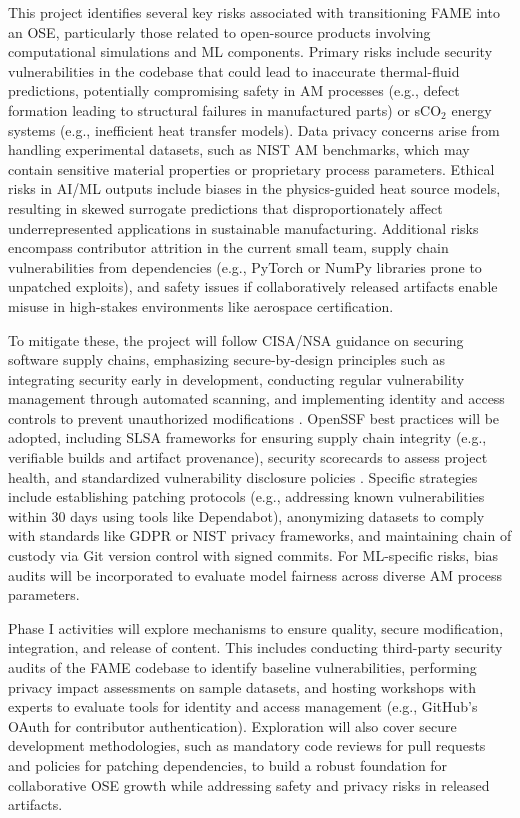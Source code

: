\documentclass[11pt]{article}
\begin{document}
\vspace{-3pt}
\noindent
This project identifies several key risks associated with transitioning FAME into an OSE, particularly those related to open-source products involving computational simulations and ML components. Primary risks include security vulnerabilities in the codebase that could lead to inaccurate thermal-fluid predictions, potentially compromising safety in AM processes (e.g., defect formation leading to structural failures in manufactured parts) or sCO$_2$ energy systems (e.g., inefficient heat transfer models). Data privacy concerns arise from handling experimental datasets, such as NIST AM benchmarks, which may contain sensitive material properties or proprietary process parameters. Ethical risks in AI/ML outputs include biases in the physics-guided heat source models, resulting in skewed surrogate predictions that disproportionately affect underrepresented applications in sustainable manufacturing. Additional risks encompass contributor attrition in the current small team, supply chain vulnerabilities from dependencies (e.g., PyTorch or NumPy libraries prone to unpatched exploits), and safety issues if collaboratively released artifacts enable misuse in high-stakes environments like aerospace certification.

To mitigate these, the project will follow CISA/NSA guidance on securing software supply chains, emphasizing secure-by-design principles such as integrating security early in development, conducting regular vulnerability management through automated scanning, and implementing identity and access controls to prevent unauthorized modifications \cite{souppayaSecureSoftwareDevelopment2022}. OpenSSF best practices will be adopted, including SLSA frameworks for ensuring supply chain integrity (e.g., verifiable builds and artifact provenance), security scorecards to assess project health, and standardized vulnerability disclosure policies \cite{SLSAOpenSource}. Specific strategies include establishing patching protocols (e.g., addressing known vulnerabilities within 30 days using tools like Dependabot), anonymizing datasets to comply with standards like GDPR or NIST privacy frameworks, and maintaining chain of custody via Git version control with signed commits. For ML-specific risks, bias audits will be incorporated to evaluate model fairness across diverse AM process parameters.

Phase I activities will explore mechanisms to ensure quality, secure modification, integration, and release of content. This includes conducting third-party security audits of the FAME codebase to identify baseline vulnerabilities, performing privacy impact assessments on sample datasets, and hosting workshops with experts to evaluate tools for identity and access management (e.g., GitHub's OAuth for contributor authentication). Exploration will also cover secure development methodologies, such as mandatory code reviews for pull requests and policies for patching dependencies, to build a robust foundation for collaborative OSE growth while addressing safety and privacy risks in released artifacts.
\vspace{-3pt}
\end{document}

